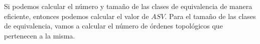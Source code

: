\begin{comment}
	\santi{Acá creo que solo hay que poner $\toOr^1_{<i} = \toOr^2_{<i}$, que denota que el conjunto de variables que quedan fijas es el mismo. Pedir esto con el $\charactheristicFunction$ es más laxo pero no sabemos controlarlo.}
	\echu{Pero la idea es justamente que no importe el orden de los elementos tampoco, o sea sólo ver que los conjuntos son iguales}
	\santi{Pero vos no estás pidiendo que los conjuntos sean iguales, sino que pedís que la función evaluada en esos conjuntos lo sea. O sea, hay conjuntos que no son iguales pero a lo mejor si los evaluás te da igual. Ahora mismo escribiste esta última relación.}
	\santi{Quedamos en definir la relación ``ideal'' $R^*$ que captura que dos permutaciones son iguales si dan la misma evaluación. Como eso es difícil, solamente calculamos la relación $R$ que dice que dos permutaciones son iguales si tienen el mismo conjunto de nodos antes del nodo $x_i$.}    
\end{comment}



Si podemos calcular el número y tamaño de las clases de equivalencia de manera eficiente, entonces podemos calcular el valor de $ASV$. Para el tamaño de las clases de equivalencia, vamos a calcular el número de órdenes topológicos que pertenecen a la misma. 

